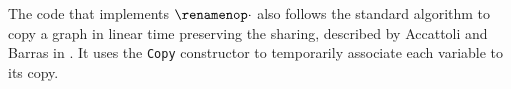The code that implements $\renamenop\cdot$ also follows the standard algorithm to copy a graph in linear
time preserving the sharing, described by Accattoli and Barras in \cite{DBLP:conf/ppdp/AccattoliB17}. It uses the \lstinline{Copy} constructor to temporarily associate
each variable to its copy.

%
%
%
%

